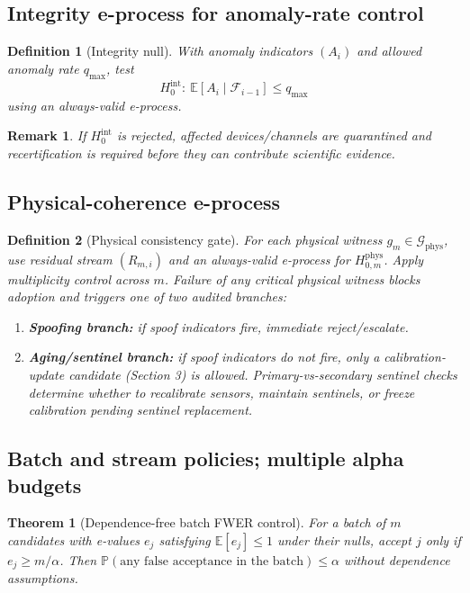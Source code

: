 \documentclass[11pt,a4paper]{article}
\newtheorem{theorem}{Theorem}[section]
\newtheorem{definition}{Definition}[section]
\newtheorem{remark}{Remark}[section]
\begin{document}
\subsection{Integrity e-process for anomaly-rate control}
\begin{definition}[Integrity null]
With anomaly indicators $(A_i)$ and allowed anomaly rate $q_{\max}$, test
\[
H_0^{\mathrm{int}}:\ \mathbb{E}[A_i\mid\mathcal{F}_{i-1}]\le q_{\max}
\]
using an always-valid e-process.
\end{definition}

\begin{remark}
If $H_0^{\mathrm{int}}$ is rejected, affected devices/channels are quarantined and recertification is required before they can contribute scientific evidence.
\end{remark}

\subsection{Physical-coherence e-process}
\begin{definition}[Physical consistency gate]
For each physical witness $g_m\in\mathcal{G}_{\mathrm{phys}}$, use residual stream $(R_{m,i})$ and an always-valid e-process for $H_{0,m}^{\mathrm{phys}}$.
Apply multiplicity control across $m$.
Failure of any critical physical witness blocks adoption and triggers one of two audited branches:
\begin{enumerate}[leftmargin=*]
\item \textbf{Spoofing branch:} if spoof indicators fire, immediate reject/escalate.
\item \textbf{Aging/sentinel branch:} if spoof indicators do not fire, only a calibration-update candidate (Section 3) is allowed.
Primary-vs-secondary sentinel checks determine whether to recalibrate sensors, maintain sentinels, or freeze calibration pending sentinel replacement.
\end{enumerate}
\end{definition}

\subsection{Batch and stream policies; multiple alpha budgets}
\begin{theorem}[Dependence-free batch FWER control]
For a batch of $m$ candidates with e-values $e_j$ satisfying $\mathbb{E}[e_j]\le 1$ under their nulls, accept $j$ only if $e_j\ge m/\alpha$.
Then $\mathbb{P}(\text{any false acceptance in the batch})\le \alpha$ without dependence assumptions.
\end{theorem}
\end{document}
